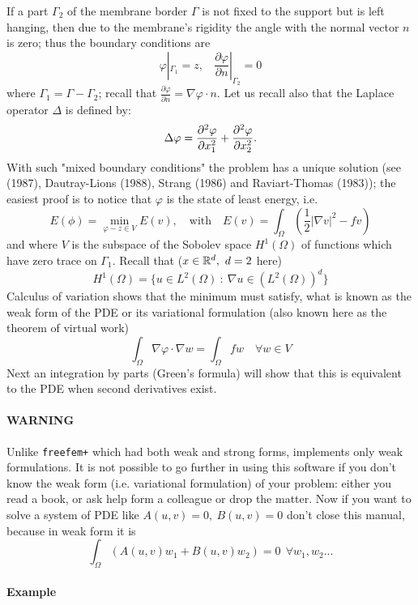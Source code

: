 \documentclass[a4paper,twoside,12pt]{book}
\def\x#1{#1\index{#1}}%
\def\p{\partial}
\def\n{\nabla}
\begin{document}
If a part $\Gamma_2$ of the membrane border $\Gamma$ is not fixed to
the support but is left hanging, then due to the membrane's rigidity the angle with the
normal vector $n$ is zero; thus the boundary conditions are
$$
    \varphi|_{\Gamma_1}=z,~~~~\frac{\p\varphi}{\p n}|_{\Gamma_2}=0
$$
where $\Gamma_1=\Gamma-\Gamma_2$; recall that
 $\frac{\p\varphi}{\p n}=\n\varphi\cdot n$.
  Let us recall also that the Laplace operator
$\Delta$ is defined by:
 $$
    \Delta \varphi = {\p ^{2}\varphi \over \p x^{2}_{1} }
    + {\p ^{2}\varphi \over \p x_{2}^{2} }.
 $$
With such "mixed boundary conditions" the problem has a unique
solution (see (1987), Dautray-Lions (1988), Strang (1986) and
Raviart-Thomas (1983)); the easiest proof is to notice that
$\varphi$ is the state of least energy, i.e.
 $$
    E(\phi) =\min_{\varphi-z\in V} E(v) ,\quad \mbox{with} \quad E(v)=\int_\Omega(\frac12|\n v|^2-fv )
 $$
and where  $V$ is the subspace of the Sobolev space $H^1(\Omega)$ of
functions which have zero trace on $\Gamma_1$. Recall that
($x\in\mathbb{R}^d,~d=2$ here)
$$
    H^1(\Omega)=\{u\in L^2(\Omega)~:~\n u\in (L^2(\Omega))^d\}
$$
Calculus of variation shows that the minimum must satisfy, what is known as the \x{weak form}
of the PDE or its
\x{variational formulation}  (also known here as the theorem of virtual work)
$$
    \int_\Omega \n\varphi\cdot\n w = \int_\Omega f w\quad\forall w\in V
$$
Next an integration by parts (Green's formula) will show that this is equivalent to
the PDE when second derivatives exist.

\paragraph{WARNING}
Unlike \texttt{freefem+} which had both weak and strong forms, \freefempp implements only
weak formulations.  It is not possible to go further in using this software if you don't know
the weak form (i.e. variational formulation) of your problem: either you read a book, or
ask help form a colleague or drop the matter.  Now if you want to solve a system of PDE
like $A(u,v)=0,~ B(u,v)=0$ don't close this manual, because in weak form it is
$$
    \int_\Omega(A(u,v)w_1+B(u,v)w_2)=0~~\forall w_1,w_2...
$$

\paragraph{Example}
\end{document}

